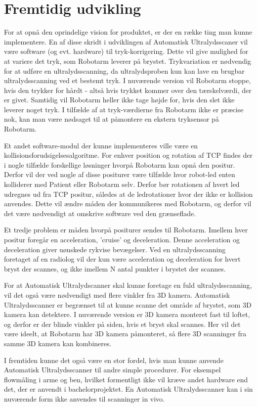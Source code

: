 \chapter{Fremtidig udvikling}\label{kapitel_Fremtidig udvikling}
For at opnå den oprindelige vision for produktet, er der en række ting man kunne implementere.
En af disse skridt i udviklingen af Automatisk Ultralydsscaner vil være software (og evt. hardware) til tryk-korrigering. Dette vil give mulighed for at variere det tryk, som Robotarm leverer på brystet. Trykvariation er nødvendig for at udføre en ultralydsscanning, da ultralydsproben kun kan lave en brugbar ultralydsscanning ved et bestemt tryk. I nuværende version vil Robotarm stoppe, hvis den trykker for hårdt - altså hvis trykket kommer over den tærskelværdi, der er givet. Samtidig vil Robotarm heller ikke tage højde for, hvis den slet ikke leverer noget tryk. I tilfælde af at tryk-værdierne fra Robotarm ikke er præcise nok, kan man være nødsaget til at påmontere en ekstern tryksensor på Robotarm.

Et andet software-modul der kunne implementeres ville være en kollisionsforudsigelsesalgoritme. For enhver position og rotation af TCP findes der i nogle tilfælde forskellige løsninger hvorpå Robotarm kan opnå den positur. Derfor vil der ved nogle af disse positurer være tilfælde hvor robot-led enten kolliderer med Patient eller Robotarm selv. Derfor bør rotationen af hvert led udregnes ud fra TCP positur, således at de ledrotationer hvor der ikke er kollision anvendes. Dette vil ændre måden der kommunikeres med Robotarm, og derfor vil det være nødvendigt at omskrive software ved den grænseflade.

Et tredje problem er måden hvorpå positurer sendes til Robotarm. Imellem hver positur foregår en acceleration, 'cruise' og deceleration. Denne acceleration og deceleration giver uønskede rykvise bevægelser. Ved en ultralydsscanning foretaget af en radiolog vil der kun være acceleration og deceleration for hvert bryst der scannes, og ikke imellem N antal punkter i brystet der scannes.

For at Automatisk Ultralydscanner skal kunne foretage en fuld ultralydsscanning, vil det også være nødvendigt med flere vinkler fra 3D kamera. Automatisk Ultralydsscanner er begrænset til at kunne scanne det område af brystet, som 3D kamera kan detektere. I nuværende version er 3D kamera monteret fast til loftet, og derfor er der blinde vinkler på siden, hvis et bryst skal scannes. Her vil det være ideelt, at Robotarm har 3D kamera påmonteret, så flere 3D scanninger fra samme 3D kamera kan kombineres.

I fremtiden kunne det også være en stor fordel, hvis man kunne anvende Automatisk Ultralydsscanner til andre simple procedurer. For eksempel flowmåling i arme og ben, hvilket formentligt ikke vil kræve andet hardware end det, der er anvendt i bachelorprojektet. En Automatisk Ultralydsscanner kan i sin nuværende form ikke anvendes til scanninger in vivo.
